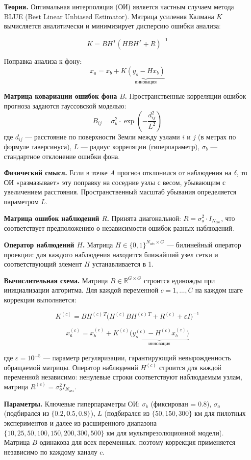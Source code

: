 \documentclass[14pt,a4paper]{extarticle}
\numberwithin{table}{section}
\numberwithin{figure}{section}
\numberwithin{equation}{section}
\begin{document}
\textbf{Теория.} Оптимальная интерполяция (ОИ) является частным случаем
метода BLUE (Best Linear Unbiased Estimator). Матрица усиления Калмана
\(K\) вычисляется аналитически и минимизирует дисперсию ошибки анализа:

\[K = B H^T (H B H^T + R)^{-1}\]

Поправка анализа к фону:
\[x_a = x_b + K \underbrace{(y_o - H x_b)}_{\text{инновация}}\]

\textbf{Матрица ковариации ошибок фона \(B\).} Пространственные
корреляции ошибок прогноза задаются гауссовской моделью:
\[B_{ij} = \sigma_b^2 \cdot \exp\left(-\frac{d_{ij}^2}{L^2}\right)\] где
\(d_{ij}\) --- расстояние по поверхности Земли между узлами \(i\) и
\(j\) (в метрах по формуле гаверсинуса), \(L\) --- радиус корреляции
(гиперпараметр), \(\sigma_b\) --- стандартное отклонение ошибки фона.

\textbf{Физический смысл.} Если в точке \(A\) прогноз отклонился от
наблюдения на \(\delta\), то ОИ «размазывает» эту поправку на соседние
узлы с весом, убывающим с увеличением расстояния. Пространственный
масштаб убывания определяется параметром \(L\).

\textbf{Матрица ошибок наблюдений \(R\).} Принята диагональной:
\(R = \sigma_o^2 \cdot I_{N_{obs}}\), что соответствует предположению о
независимости ошибок разных наблюдений.

\textbf{Оператор наблюдений \(H\).} Матрица
\(H \in \{0,1\}^{N_{obs} \times G}\) --- билинейный оператор проекции:
для каждого наблюдения находится ближайший узел сетки и соответствующий
элемент \(H\) устанавливается в 1.

\textbf{Вычислительная схема.} Матрица \(B \in \mathbb{R}^{G \times G}\)
строится единожды при инициализации алгоритма. Для каждой переменной
\(c = 1,\ldots,C\) на каждом шаге коррекции выполняется:

\[K^{(c)} = B H^{(c)\,T}\bigl(H^{(c)} B H^{(c)\,T} + R^{(c)} + \varepsilon I\bigr)^{-1}\]

\[x_a^{(c)} = x_b^{(c)} + K^{(c)}\underbrace{\bigl(y_o^{(c)} - H^{(c)} x_b^{(c)}\bigr)}_{\text{инновация}}\]

где \(\varepsilon = 10^{-5}\) --- параметр регуляризации, гарантирующий
невырожденность обращаемой матрицы. Оператор наблюдений \(H^{(c)}\)
строится для каждой переменной независимо: ненулевые строки
соответствуют наблюдаемым узлам, матрица
\(R^{(c)} = \sigma_o^2 I_{N_{obs}}\).

\textbf{Параметры.} Ключевые гиперпараметры ОИ: \(\sigma_b\) (фиксирован
= 0.8), \(\sigma_o\) (подбирался из \(\{0.2, 0.5, 0.8\}\)), \(L\)
(подбирался из \(\{50, 150, 300\}\) км для пилотных экспериментов
и далее из расширенного диапазона \(\{10, 25, 50, 100, 150, 200, 300, 500\}\) км
для мультирезолюционной модели). Матрица \(B\) одинакова
для всех переменных, поэтому коррекция применяется независимо по каждому
каналу \(c\).
\end{document}
